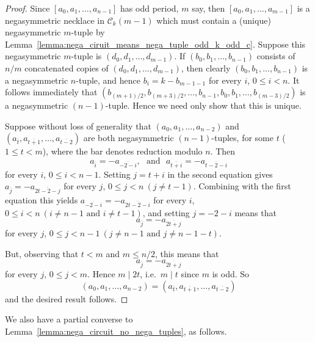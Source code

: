 \documentclass[a4paper,11pt]{article}
\theoremstyle{plain}
\theoremstyle{definition}
\theoremstyle{remark}
\begin{document}
\begin{proof}
Since $[a_0,a_1,\dots,a_{n-1}]$ has odd period, $m$ say, then $[a_0,a_1,\dots,a_{m-1}]$ is a
negasymmetric necklace in $\mathcal{C}_k(m-1)$ which must contain a (unique) negasymmetric
$m$-tuple by Lemma~\ref{lemma:nega_ciruit_means_nega_tuple_odd_k_odd_c}. Suppose this negasymmetric
$m$-tuple is $(d_0,d_1,\dots,d_{m-1})$.  If $(b_0,b_1,\dots,b_{n-1})$ consists of $n/m$
concatenated copies of $(d_0,d_1,\dots,d_{m-1})$, then clearly $(b_0,b_1,\dots,b_{n-1})$ is a
negasymmetric $n$-tuple, and hence $b_i=k-b_{m-1-1}$ for every $i$, $0\leq i<n$. It follows
immediately that $(b_{(m+1)/2},b_{(m+3)/2},\dots,b_{n-1},b_0,b_1,\dots,b_{(m-3)/2})$ is a
negasymmetric $(n-1)$-tuple. Hence we need only show that this is unique.

Suppose without loss of generality that $(a_0,a_1,\dots,a_{n-2})$ and
$(a_{\overline{t}},a_{\overline{t+1}},\dots,a_{\overline{t-2}})$ are both negasymmetric
$(n-1)$-tuples, for some $t$ ($1\leq t<m$), where the bar denotes reduction modulo $n$.  Then
\[ a_{\overline{i}}=-a_{\overline{-2-i}}, \text{~~and~~} a_{\overline{t+i}}=-a_{\overline{t-2-i}}
\]
for every $i$, $0\leq i<n-1$.  Setting $j=t+i$ in the second equation gives
$a_{\overline{j}}=-a_{\overline{2t-2-j}}$ for every $j$, $0\leq j<n~(j\neq t-1)$. Combining with
the first equation this yields $a_{\overline{-2-i}}=-a_{\overline{2t-2-i}}$ for every $i$, $0\leq
i<n~(i\neq n-1 \text{~and~} i\neq t-1)$, and setting $j=-2-i$ means that
\[ a_{\overline{j}}=-a_{\overline{2t+j}} \]
for every $j$, $0\leq j<n-1~(j\neq n-1 \text{~and~} j\neq n-1-t)$.


But, observing that $t<m$ and $m\leq n/2$, this means that
\[ a_{\overline{j}}=-a_{\overline{2t+j}} \]
for every $j$, $0\leq j<m$.  Hence $m\mid 2t$, i.e.\ $m\mid t$ since $m$ is odd.  So
\[ (a_0,a_1,\dots,a_{n-2})=(a_{\overline{t}},a_{\overline{t+1}},\dots,a_{\overline{t-2}}) \]
and the desired result follows.
\end{proof}



We also have a partial converse to Lemma~\ref{lemma:nega_circuit_no_nega_tuples}, as follows.
\end{document}

